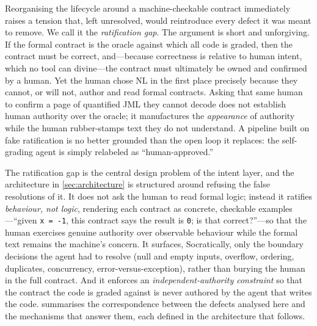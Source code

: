 Reorganising the lifecycle around a machine-checkable contract immediately raises a tension that, left unresolved, would reintroduce every defect it was meant to remove. We call it the \emph{ratification gap}. The argument is short and unforgiving. If the formal contract is the oracle against which all code is graded, then the contract must be correct, and---because correctness is relative to human intent, which no tool can divine---the contract must ultimately be owned and confirmed by a human. Yet the human chose NL in the first place precisely because they cannot, or will not, author and read formal contracts. Asking that same human to confirm a page of quantified JML they cannot decode does not establish human authority over the oracle; it manufactures the \emph{appearance} of authority while the human rubber-stamps text they do not understand. A pipeline built on fake ratification is no better grounded than the open loop it replaces: the self-grading agent is simply relabeled as ``human-approved.''

The ratification gap is the central design problem of the intent layer, and the architecture in \cref{sec:architecture} is structured around refusing the false resolutions of it. It does not ask the human to read formal logic; instead it ratifies \emph{behaviour, not logic}, rendering each contract as concrete, checkable examples---``given \texttt{x = -1}, this contract says the result is \texttt{0}; is that correct?''---so that the human exercises genuine authority over observable behaviour while the formal text remains the machine's concern. It surfaces, Socratically, only the boundary decisions the agent had to resolve (null and empty inputs, overflow, ordering, duplicates, concurrency, error-versus-exception), rather than burying the human in the full contract. And it enforces an \emph{independent-authority constraint} so that the contract the code is graded against is never authored by the agent that writes the code.  summarises the correspondence between the defects analysed here and the mechanisms that answer them, each defined in the architecture that follows.

